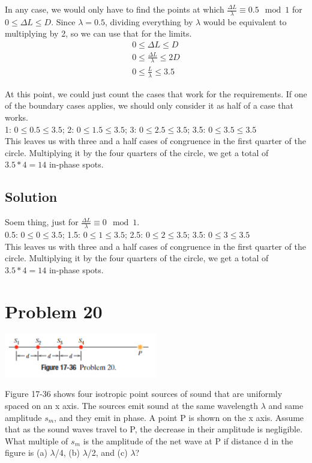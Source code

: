 \documentclass[12pt]{article}
\begin{document}
            In any case, we would only have to find the points at which $\frac{\Delta L}{\lambda} \equiv 0.5 \mod 1$ for $0 \leq \Delta L \leq D$.
            Since $\lambda = 0.5$, dividing everything by $\lambda$ would be equivalent to multiplying by 2, so we can use that for the limits.
            \begin{gather}
                0 \leq \Delta L \leq D\\
                0 \leq \frac{\Delta L}{\lambda} \leq 2D\\
                0 \leq \frac{L}{\lambda} \leq 3.5
            \end{gather}

            At this point, we could just count the cases that work for the requirements.
            If one of the boundary cases applies, we should only consider it as half of a case that works.\\
            1: $0 \leq 0.5 \leq 3.5$;
            2: $0 \leq 1.5 \leq 3.5$;
            3: $0 \leq 2.5 \leq 3.5$;
            3.5: $0 \leq 3.5 \leq 3.5$\\
            This leaves us with three and a half cases of congruence in the first quarter of the circle.
            Multiplying it by the four quarters of the circle, we get a total of $3.5 * 4 = \boxed{14}$ in-phase spots.

        \subsection{Solution}
            Soem thing, just for $\frac{\Delta L}{\lambda} \equiv 0 \mod 1$.\\
            0.5: $0 \leq 0 \leq 3.5$;
            1.5: $0 \leq 1 \leq 3.5$;
            2.5: $0 \leq 2 \leq 3.5$;
            3.5: $0 \leq 3 \leq 3.5$\\
            This leaves us with three and a half cases of congruence in the first quarter of the circle.
            Multiplying it by the four quarters of the circle, we get a total of $3.5 * 4 = \boxed{14}$ in-phase spots.

    \pagebreak
    \section{Problem 20}
        \begin{center}
            \includegraphics[width=0.5\textwidth]{17-36.png} 
        \end{center}
        Figure 17-36 shows four isotropic point sources of sound that are uniformly spaced on an x axis. 
        The sources emit sound at the same wavelength $\lambda$ and same amplitude $s_m$, and they emit in phase. 
        A point P is shown on the x axis. 
        Assume that as the sound waves travel to P, the decrease in their amplitude is negligible. 
        What multiple of $s_m$ is the amplitude of the net wave at P if distance d in the figure is (a) $\lambda$/4, (b) $\lambda$/2, and (c) $\lambda$?
\end{document}
